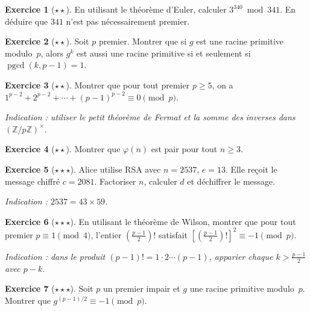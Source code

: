 \documentclass[12pt,a4paper,openany]{book}
\theoremstyle{definition}
\newtheorem{exercice}{Exercice}[chapter]
\theoremstyle{plain}
\theoremstyle{remark}
\newcommand{\Z}{\mathbb{Z}}
\DeclareMathOperator{\pgcd}{pgcd}
\begin{document}
\begin{exercice}[$\star\star$]
\label{exo:few-6}
En utilisant le théorème d'Euler, calculer $3^{340} \bmod 341$.
En déduire que $341$ n'est pas nécessairement premier.
\end{exercice}

\begin{exercice}[$\star\star$]
\label{exo:few-7}
Soit $p$ premier. Montrer que si $g$ est une racine primitive modulo~$p$, alors
$g^k$ est aussi une racine primitive si et seulement si $\pgcd(k, p-1) = 1$.
\end{exercice}

\begin{exercice}[$\star\star$]
\label{exo:few-8}
Montrer que pour tout premier $p \geqslant 5$, on a
$1^{p-2} + 2^{p-2} + \cdots + (p-1)^{p-2} \equiv 0 \pmod{p}$.

\emph{Indication : utiliser le petit théorème de Fermat et la somme des inverses
dans $(\Z/p\Z)^\times$.}
\end{exercice}

\begin{exercice}[$\star\star$]
\label{exo:few-9}
Montrer que $\varphi(n)$ est pair pour tout $n \geqslant 3$.
\end{exercice}

\begin{exercice}[$\star\star\star$]
\label{exo:few-10}
Alice utilise RSA avec $n = 2537$, $e = 13$. Elle reçoit le message chiffré $c = 2081$.
Factoriser $n$, calculer $d$ et déchiffrer le message.

\emph{Indication : $2537 = 43 \times 59$.}
\end{exercice}

\begin{exercice}[$\star\star\star$]
\label{exo:few-11}
En utilisant le théorème de Wilson, montrer que pour tout premier
$p \equiv 1 \pmod{4}$, l'entier $\left(\frac{p-1}{2}\right)!$
satisfait $\left[\left(\frac{p-1}{2}\right)!\right]^2 \equiv -1 \pmod{p}$.

\emph{Indication : dans le produit $(p-1)! = 1 \cdot 2 \cdots (p-1)$, apparier
chaque $k > \frac{p-1}{2}$ avec $p - k$.}
\end{exercice}

\begin{exercice}[$\star\star\star$]
\label{exo:few-12}
Soit $p$ un premier impair et $g$ une racine primitive modulo~$p$. Montrer que
$g^{(p-1)/2} \equiv -1 \pmod{p}$.
\end{exercice}
\end{document}
